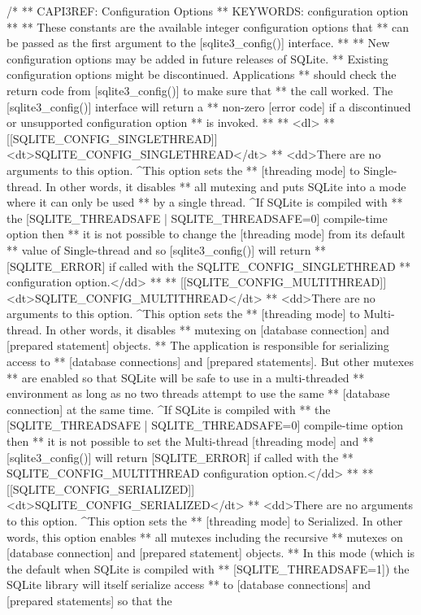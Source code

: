\begin{Codex}[label=sqlite3.h,numbers=left]
{/*
** CAPI3REF: Configuration Options
** KEYWORDS: {configuration option}
**
** These constants are the available integer configuration options that
** can be passed as the first argument to the [sqlite3_config()] interface.
**
** New configuration options may be added in future releases of SQLite.
** Existing configuration options might be discontinued.  Applications
** should check the return code from [sqlite3_config()] to make sure that
** the call worked.  The [sqlite3_config()] interface will return a
** non-zero [error code] if a discontinued or unsupported configuration option
** is invoked.
**
** <dl>
** [[SQLITE_CONFIG_SINGLETHREAD]] <dt>SQLITE_CONFIG_SINGLETHREAD</dt>
** <dd>There are no arguments to this option.  ^This option sets the
** [threading mode] to Single-thread.  In other words, it disables
** all mutexing and puts SQLite into a mode where it can only be used
** by a single thread.   ^If SQLite is compiled with
** the [SQLITE_THREADSAFE | SQLITE_THREADSAFE=0] compile-time option then
** it is not possible to change the [threading mode] from its default
** value of Single-thread and so [sqlite3_config()] will return 
** [SQLITE_ERROR] if called with the SQLITE_CONFIG_SINGLETHREAD
** configuration option.</dd>
**
** [[SQLITE_CONFIG_MULTITHREAD]] <dt>SQLITE_CONFIG_MULTITHREAD</dt>
** <dd>There are no arguments to this option.  ^This option sets the
** [threading mode] to Multi-thread.  In other words, it disables
** mutexing on [database connection] and [prepared statement] objects.
** The application is responsible for serializing access to
** [database connections] and [prepared statements].  But other mutexes
** are enabled so that SQLite will be safe to use in a multi-threaded
** environment as long as no two threads attempt to use the same
** [database connection] at the same time.  ^If SQLite is compiled with
** the [SQLITE_THREADSAFE | SQLITE_THREADSAFE=0] compile-time option then
** it is not possible to set the Multi-thread [threading mode] and
** [sqlite3_config()] will return [SQLITE_ERROR] if called with the
** SQLITE_CONFIG_MULTITHREAD configuration option.</dd>
**
** [[SQLITE_CONFIG_SERIALIZED]] <dt>SQLITE_CONFIG_SERIALIZED</dt>
** <dd>There are no arguments to this option.  ^This option sets the
** [threading mode] to Serialized. In other words, this option enables
** all mutexes including the recursive
** mutexes on [database connection] and [prepared statement] objects.
** In this mode (which is the default when SQLite is compiled with
** [SQLITE_THREADSAFE=1]) the SQLite library will itself serialize access
** to [database connections] and [prepared statements] so that the
}
\end{Codex}
